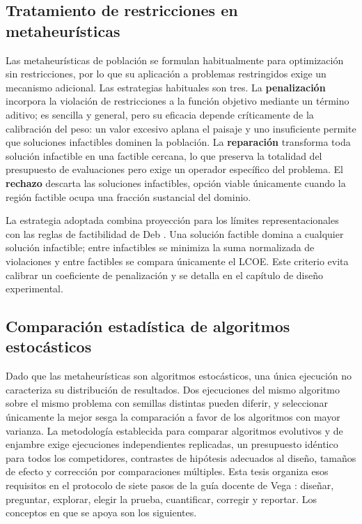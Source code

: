 \subsection{Tratamiento de restricciones en metaheurísticas}

Las metaheurísticas de población se formulan habitualmente para optimización sin restricciones, por lo que su aplicación a problemas restringidos exige un mecanismo adicional. Las estrategias habituales son tres. La \textbf{penalización} incorpora la violación de restricciones a la función objetivo mediante un término aditivo; es sencilla y general, pero su eficacia depende críticamente de la calibración del peso: un valor excesivo aplana el paisaje y uno insuficiente permite que soluciones infactibles dominen la población. La \textbf{reparación} transforma toda solución infactible en una factible cercana, lo que preserva la totalidad del presupuesto de evaluaciones pero exige un operador específico del problema. El \textbf{rechazo} descarta las soluciones infactibles, opción viable únicamente cuando la región factible ocupa una fracción sustancial del dominio.

La estrategia adoptada combina proyección para los límites representacionales con las reglas de factibilidad de Deb \cite{Deb2000Constraint}. Una solución factible domina a cualquier solución infactible; entre infactibles se minimiza la suma normalizada de violaciones y entre factibles se compara únicamente el LCOE. Este criterio evita calibrar un coeficiente de penalización y se detalla en el capítulo de diseño experimental.

\subsection{Comparación estadística de algoritmos estocásticos}
\label{sec:marco_estadistica}

Dado que las metaheurísticas son algoritmos estocásticos, una única ejecución no caracteriza su distribución de resultados. Dos ejecuciones del mismo algoritmo sobre el mismo problema con semillas distintas pueden diferir, y seleccionar únicamente la mejor sesga la comparación a favor de los algoritmos con mayor varianza. La metodología establecida para comparar algoritmos evolutivos y de enjambre \cite{Demsar2006Statistical,Garcia2008Extension,Derrac2011Tutorial,Arcuri2014Hitchhiker} exige ejecuciones independientes replicadas, un presupuesto idéntico para todos los competidores, contrastes de hipótesis adecuados al diseño, tamaños de efecto y corrección por comparaciones múltiples. Esta tesis organiza esos requisitos en el protocolo de siete pasos de la guía docente de Vega \cite{VegaGuiaEstadistica}: diseñar, preguntar, explorar, elegir la prueba, cuantificar, corregir y reportar. Los conceptos en que se apoya son los siguientes.


